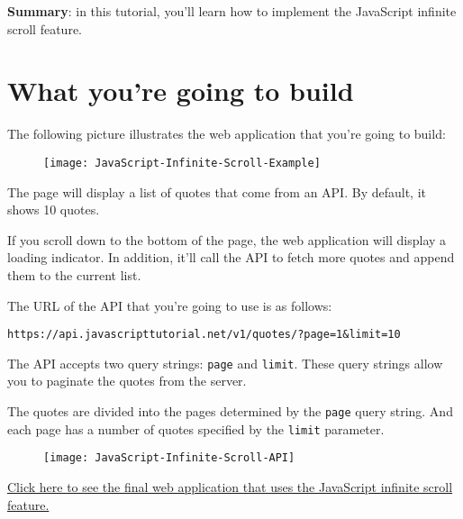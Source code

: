 \documentclass[11pt]{article}
\newenvironment{displayquote} %
{\begin{shaded*}\noindent
\quoting[leftmargin=0pt, vskip=0pt]
}
 {\endquoting
 \end{shaded*}
}
\begin{document}
\begin{displayquote}
\textbf{Summary}: in this tutorial, you'll learn how to implement the
JavaScript infinite scroll feature.
\end{displayquote}

\section*{What you're going to build}

The following picture illustrates the web application that
you're going to build:

\begin{figure}[h]
\centering
\texttt{[image: JavaScript-Infinite-Scroll-Example]}
\end{figure}

\noindent
The page will display a list of quotes that come from an API.
By default, it shows 10 quotes.
\newline

\noindent
If you scroll down to the bottom of the page, the web application will
display a loading indicator. In addition, it'll call the API to fetch
more quotes and append them to the current list.
\newline

\noindent
The URL of the API that you're going to use is as follows:

\begin{lstlisting}
https://api.javascripttutorial.net/v1/quotes/?page=1&limit=10
\end{lstlisting}

\noindent
The API accepts two query strings: \verb|page| and \verb|limit|. These query
strings allow you to paginate the quotes from the server.
\newline

\noindent
The quotes are divided into the pages determined by the \verb|page| query string.
And each page has a number of quotes specified by the \verb|limit| parameter.

\begin{figure}[h]
\centering
\texttt{[image: JavaScript-Infinite-Scroll-API]}
\end{figure}

\noindent
\href{https://www.javascripttutorial.net/sample/dom/infinite-scroll/}{Click here to see the final web application that uses the JavaScript infinite scroll feature.}
\end{document}
